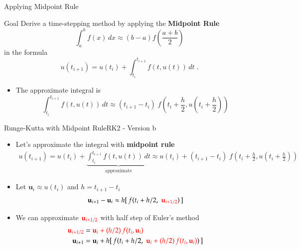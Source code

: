 \documentclass[10pt]{beamer}
\begin{document}
\begin{frame}{Applying Midpoint Rule}

\begin{block}{Goal}
Derive a time-stepping method by applying the \textbf{Midpoint Rule}
    $$
    \int_a^b f(x) \,dx \approx (b-a) f\left(\frac{a+b}{2}\right)
    $$
in the formula 
                $$
            u(t_{i+1}) = u(t_i) + \int_{t_i}^{t_{i+1}} f(t, u(t)) \, dt\;.
            $$
\end{block}

\begin{itemize}
    \item The approximate integral is 
    $$
    \int_{t_i}^{t_{i+1}} f(t, u(t)) \, dt \approx (t_{i+1}-t_i) \;f\left(t_{i}+\frac{h}{2},u\left(t_{i}+\frac{h}{2}\right)\right)
    $$
\end{itemize}
\end{frame}

\begin{frame}{Runge-Kutta with Midpoint Rule}{RK2 - Version b}
\begin{itemize}
    
    \item Let's approximate the integral with \textbf{midpoint rule}
        \begin{align*}
        u(t_{i+1}) =  u(t_i)+\underbrace{\int_{t_i}^{t_{i+1}} f(t, u(t)) \, dt}_{\text{approximate}} \approx u(t_i)+(t_{i+1}-t_i) \;f\left(t_{i}+\frac{h}{2},u\left(t_{i}+\frac{h}{2}\right)\right)
        \end{align*}
    \item Let $\textbf{u}_i \approx u(t_i)$ and $h=t_{i+1}-t_i$
    \[
       \textbf{u}_{i+1} - \textbf{u}_i\approx h[\, f(t_i + h/2,\; \color{red} \textbf{u}_{i+1/2}\color{black} )\, ]
    \]
    
    \item We can approximate $ \color{red}\textbf{u}_{i+1/2}$ with half step of Euler's method
    \begin{align*}
    \textcolor{red}{\textbf{u}_{i+1/2}} &= \textcolor{red}{\textbf{u}_i + (h/2)\, f(t_i, \textbf{u}_i) }\\
    \textbf{u}_{i+1} &= \textbf{u}_i + h[\, f(t_i + h/2,\; \textcolor{red}{\textbf{u}_i + (h/2)\, f(t_i, \textbf{u}_i)})\, ] 
    \end{align*}


\end{itemize}
\end{frame}
\end{document}
